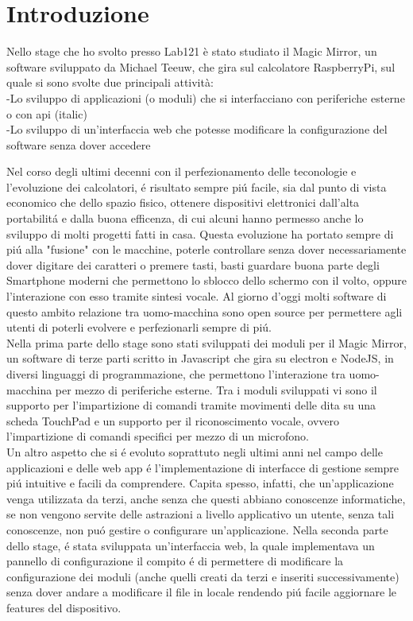 \chapter*{Introduzione}

Nello stage che ho svolto presso Lab121 è stato studiato il Magic Mirror, un software sviluppato da Michael Teeuw,
che gira sul calcolatore RaspberryPi, sul quale si sono svolte due principali attività:\\
-Lo sviluppo di applicazioni (o moduli) che si interfacciano con periferiche esterne o con api (italic)\\
-Lo sviluppo di un'interfaccia web che potesse modificare la configurazione del software senza dover accedere




Nel corso degli ultimi decenni con il perfezionamento delle teconologie e l'evoluzione dei
calcolatori, \'e risultato sempre pi\'u facile, sia dal punto di vista economico che dello spazio fisico,
ottenere dispositivi elettronici dall'alta portabilit\'a e dalla buona efficenza, di cui
alcuni hanno permesso anche lo sviluppo di molti progetti fatti in casa.
Questa evoluzione ha portato sempre di pi\'u alla "fusione" con le macchine, poterle controllare senza
dover necessariamente dover digitare dei caratteri o premere tasti,
basti guardare buona parte degli Smartphone moderni che permettono lo sblocco dello schermo con
il volto, oppure l'interazione con esso tramite sintesi vocale.
Al giorno d'oggi molti software di questo ambito relazione tra uomo-macchina
sono open source per permettere agli utenti di poterli evolvere e perfezionarli sempre di pi\'u.\\
Nella prima parte dello stage sono stati sviluppati dei moduli per il Magic Mirror, un software
di terze parti scritto in Javascript che gira su electron e NodeJS,
in diversi linguaggi di programmazione, che permettono l'interazione tra uomo-macchina per
mezzo di periferiche esterne.
Tra i moduli sviluppati vi sono il supporto per l'impartizione di comandi
tramite movimenti delle dita su una scheda TouchPad e un supporto per il riconoscimento vocale,
ovvero l'impartizione di comandi specifici per mezzo di un microfono.
\\[2\baselineskip]
Un altro aspetto che si \'e evoluto soprattuto negli ultimi anni nel campo
delle applicazioni e delle web app \'e l'implementazione di interfacce di gestione sempre pi\'u
intuitive e facili da comprendere. Capita spesso, infatti, che un'applicazione
venga utilizzata da terzi, anche senza che questi abbiano conoscenze informatiche,
se non vengono servite delle astrazioni a livello applicativo un utente, senza
tali conoscenze, non pu\'o gestire o configurare un'applicazione.
Nella seconda parte dello stage,
\'e stata sviluppata un'interfaccia web, la quale implementava un pannello di configurazione
il compito \'e di permettere di modificare la configurazione
dei moduli (anche quelli creati da terzi e inseriti successivamente) senza dover andare a modificare il
file in locale rendendo pi\'u facile aggiornare le features del dispositivo.
